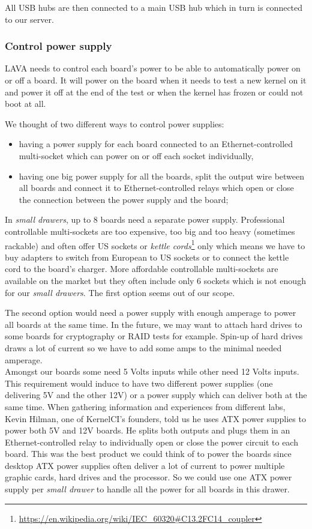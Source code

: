 All USB hubs are then connected to a main USB hub which in turn is connected to our server.

\subsubsection{Control power supply}

LAVA needs to control each board's power to be able to automatically power on or off a board. It will power on the board when it needs to test a new kernel on it and power it off at the end of the test or when the kernel has frozen or could not boot at all.

We thought of two different ways to control power supplies:
\begin{itemize}
  \item having a power supply for each board connected to an Ethernet-controlled multi-socket which can power on or off each socket individually,
  \item having one big power supply for all the boards, split the output wire between all boards and connect it to Ethernet-controlled relays which open or close the connection between the power supply and the board;
\end{itemize}

In \textit{small drawers}, up to 8 boards need a separate power supply. Professional controllable multi-sockets are too expensive, too big and too heavy (sometimes rackable) and often offer US sockets or \textit{kettle cords}\footnote{\url{https://en.wikipedia.org/wiki/IEC\_60320\#C13.2FC14\_coupler}} only which means we have to buy adapters to switch from European to US sockets or to connect the kettle cord to the board's charger. More affordable controllable multi-sockets are available on the market but they often include only 6 sockets which is not enough for our \textit{small drawers}. The first option seems out of our scope.

The second option would need a power supply with enough amperage to power all boards at the same time. In the future, we may want to attach hard drives to some boards for cryptography or RAID tests for example. Spin-up of hard drives draws a lot of current so we have to add some amps to the minimal needed amperage.\\
Amongst our boards some need 5 Volts inputs while other need 12 Volts inputs. This requirement would induce to have two different power supplies (one delivering 5V and the other 12V) or a power supply which can deliver both at the same time. When gathering information and experiences from different labs, Kevin Hilman, one of KernelCI's founders, told us he uses ATX power supplies to power both 5V and 12V boards. He splits both outputs and plugs them in an Ethernet-controlled relay to individually open or close the power circuit to each board. This was the best product we could think of to power the boards since desktop ATX power supplies often deliver a lot of current to power multiple graphic cards, hard drives and the processor. So we could use one ATX power supply per \textit{small drawer} to handle all the power for all boards in this drawer.

